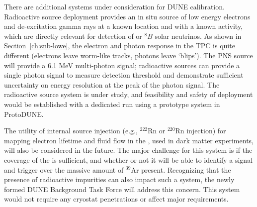 There are 
additional systems under consideration for DUNE calibration. Radioactive source deployment provides an in situ source of low energy electrons and de-excitation gamma rays at a known location and with a known activity, which are directly relevant for detection of  or $^{8}B$ solar neutrinos. As shown in Section~\ref{ch:snb-lowe}, the electron and photon response in the TPC is quite different (electrons leave worm-like tracks, photons leave `blips'). The PNS source will provide a 6.1 MeV multi-photon signal; radioactive sources can provide a single photon signal to measure detection threshold and demonstrate sufficient uncertainty on energy resolution at the peak of the  photon signal.  The radioactive source system is under study, and feasibility and safety of deployment would be established with a dedicated run using a prototype system in ProtoDUNE.

The utility of internal source injection (e.g., ${}^{222}$Rn or ${}^{220}$Rn injection) for mapping electron lifetime and fluid flow in the , used in dark matter experiments, will also be considered in the future. The major challenge for this system is if the 
coverage of the  is sufficient, and whether or not it will be able to identify a signal and trigger over the massive amount of ${}^{39}$Ar present. Recognizing that the presence of radioactive impurities can also impact such a system, the newly formed DUNE  Background Task Force will address this concern. This system would not require any cryostat penetrations or affect major  requirements.



